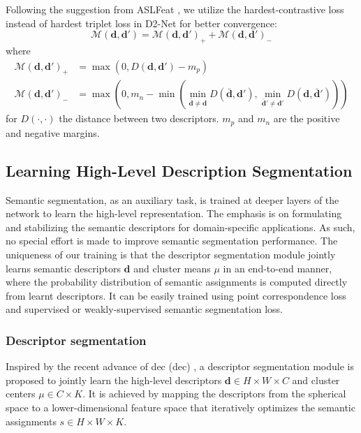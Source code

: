 Following the suggestion from ASLFeat \cite{luo2020aslfeat}, we utilize the hardest-contrastive loss \cite{choy2019fully} instead of hardest triplet loss in D2-Net \cite{dusmanu2019d2} for better convergence: 
\begin{equation} \label{eq:learning_d2distance}
\mathcal{M}(\mathbf{d}, \mathbf{d}')
  = \mathcal{M}(\mathbf{d}, \mathbf{d}')_+ 
    + \mathcal{M}(\mathbf{d}, \mathbf{d}')_-
\end{equation}
where
\begin{equation} \nonumber
\begin{split}
  \mathcal{M}(\mathbf{d}, \mathbf{d}')_+ 
    & = \max(0, D(\mathbf{d}, \mathbf{d}')-m_p) \\
  \mathcal{M}(\mathbf{d}, \mathbf{d}')_- 
    & = \max(0, m_n - \min(
      \min_{\bar{\mathbf{d}} \neq \mathbf{d}}D(\bar{\mathbf{d}}, \mathbf{d}'),
      \min_{\bar{\mathbf{d}}' \neq \mathbf{d}'}D(\mathbf{d},\bar{\mathbf{d}}')
      ))
\end{split}
\end{equation}
for $D(\cdot,\cdot)$ the distance between two descriptors. $m_p$ and $m_n$ are the positive and negative margins.

\subsection{Learning High-Level Description Segmentation}
Semantic segmentation, as an auxiliary task, is trained at deeper layers of the network to learn the high-level representation. 
The emphasis is on formulating and stabilizing the semantic descriptors for domain-specific applications. 
As such, no special effort is made to improve semantic segmentation performance. 
The uniqueness of our training is that the descriptor segmentation module jointly learns semantic descriptors $\mathbf{d}$ and cluster means $\mu$ in an end-to-end manner, where the probability distribution of semantic assignments is computed directly from learnt descriptors. 
It can be easily trained using point correspondence loss and supervised or weakly-supervised semantic segmentation loss.


\subsubsection{Descriptor segmentation}
Inspired by the recent advance of \acrlong{dec} (\acrshort{dec}) \cite{xie2016unsupervised}, a descriptor segmentation module is proposed to jointly learn the high-level descriptors $\mathbf{d} \in {H \times W \times C}$ and cluster centers $\mu \in {C \times K}$. 
It is achieved by mapping the descriptors from the spherical space to a lower-dimensional feature space that iteratively optimizes the semantic assignments $s\in {H \times W \times K}$.

